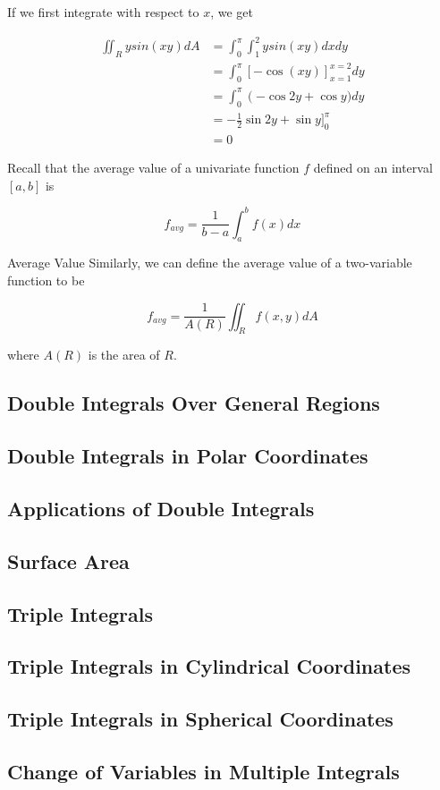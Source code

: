         If we first integrate with respect to $x$, we get

        \begin{align*}
            \iint_R ysin(xy)dA  &= \int_0^{\pi} \int_1^2 y sin(xy) dx dy \\
                                &= \int_0^{\pi} \left[-\cos{(xy)}\right]_{x=1}^{x=2} dy \\
                                &= \int_0^{\pi} \left(-\cos{2y} + \cos{y})dy \\
                                &= -\frac{1}{2}\sin{2y} + \sin{y}\Big]_0^{\pi} \\
                                &= 0
        \end{align*}

        Recall that the average value of a univariate function $f$ defined on an interval $[a,b]$ is

        \[
            f_{avg} = \frac{1}{b-a} \int_a^b f(x)dx
        \]

        \begin{theorem}{Average Value}
            Similarly, we can define the average value of a two-variable function to be

            \[
                f_{avg} = \frac{1}{A(R)} \iint_R f(x,y) dA
            \]

            where $A(R)$ is the area of $R$.
        \end{theorem}

    \subsection{Double Integrals Over General Regions}  %



    \subsection{Double Integrals in Polar Coordinates}  %
    \subsection{Applications of Double Integrals}   %
    \subsection{Surface Area}   %
    \subsection{Triple Integrals}   %
    \subsection{Triple Integrals in Cylindrical Coordinates}    %
    \subsection{Triple Integrals in Spherical Coordinates}  %
    \subsection{Change of Variables in Multiple Integrals}  %
